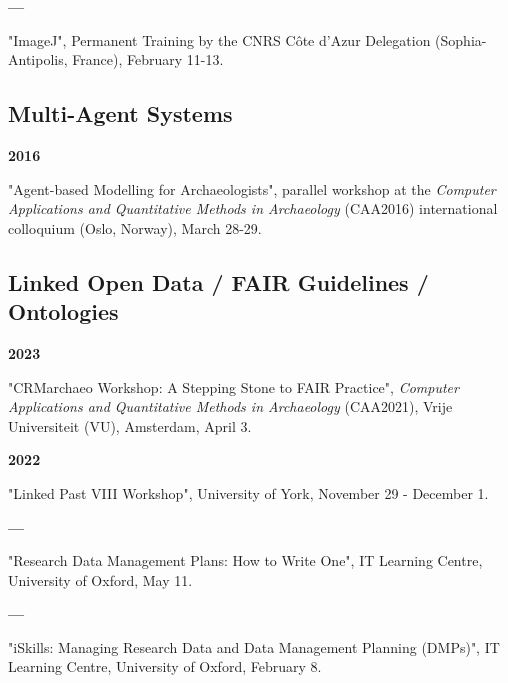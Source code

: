 \documentclass{article}
\newcommand{\fr}[1]{} %
\newcommand{\en}[1]{#1}   %
\begin{document}
\smallbreak
\textbf{--- }
\fr{"ImageJ", Formation permanente de la Délégation CNRS Côte d'Azur (Sophia-Antipolis, France), 11-13 Février.}
\en{"ImageJ", Permanent Training by the CNRS Côte d'Azur Delegation (Sophia-Antipolis, France), February 11-13.}

\smallbreak

\subsection*{\fr{Systèmes Multi-Agents}\en{Multi-Agent Systems}}

\textbf{2016 }
\fr{"Agent-based modelling for archaeologists", atelier en parallèle du \textit{Computer Applications and Quantitative Methods in Archaeology} (CAA2016) international colloquium (Oslo, Norway), 28-29 Mars.}
\en{"Agent-based Modelling for Archaeologists", parallel workshop at the \textit{Computer Applications and Quantitative Methods in Archaeology} (CAA2016) international colloquium (Oslo, Norway), March 28-29.}

\smallbreak

\subsection*{\fr{Linked Open Data / directives FAIR / Ontologies}\en{Linked Open Data / FAIR Guidelines / Ontologies}}

\textbf{2023 }
\fr{"CRMarchaeo Workshop: a stepping stone to FAIR practice", \textit{Computer Applications and Quantitative Methods in Archaeology} (CAA2021), Vrije Universiteit (VU), Amsterdam, 3 Avril.}
\en{"CRMarchaeo Workshop: A Stepping Stone to FAIR Practice", \textit{Computer Applications and Quantitative Methods in Archaeology} (CAA2021), Vrije Universiteit (VU), Amsterdam, April 3.}

\smallbreak
\textbf{2022 }
\fr{"Linked Past VIII workshop", University of York, 29 Novembre - 1 Décembre.}
\en{"Linked Past VIII Workshop", University of York, November 29 - December 1.}

\smallbreak
\textbf{--- }
\fr{"Research data management plans: How to write one", IT Learning Centre, University of Oxford, 11 Mai.}
\en{"Research Data Management Plans: How to Write One", IT Learning Centre, University of Oxford, May 11.}

\smallbreak
\textbf{--- }
\fr{"iSkills: Managing research data and Data Management Planning (DMPs)", IT Learning Centre, University of Oxford, 8 Février.}
\en{"iSkills: Managing Research Data and Data Management Planning (DMPs)", IT Learning Centre, University of Oxford, February 8.}
\end{document}
